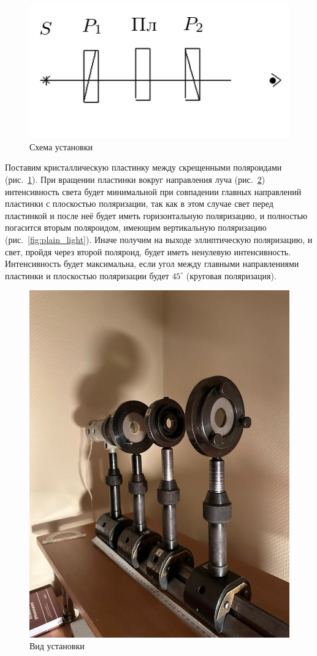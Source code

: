 \documentclass[a4paper, 12pt]{article}
\begin{document}
\begin{figure}[h!]
\begin{center}
   \includegraphics[width=0.5\linewidth]{plain_scheme.png}
\end{center}
\caption{Схема установки}
\label{fig:plain_scheme}
\end{figure}

Поставим кристаллическую пластинку между скрещенными поляроидами (рис.~\ref{fig:plain_scheme}). При вращении пластинки вокруг направления луча (рис.~\ref{fig:plain_ust}) интенсивность света будет минимальной при совпадении главных направлений пластинки с плоскостью поляризации, так как в этом случае свет перед пластинкой и после неё будет иметь горизонтальную поляризацию, и полностью погасится вторым поляроидом, имеющим вертикальную поляризацию (рис.~\ref{fig:plain_light}). Иначе получим на выходе эллиптическую поляризацию, и свет, пройдя через второй поляроид, будет иметь ненулевую интенсивность. Интенсивность будет максимальна, если угол между главными направлениями пластинки и плоскостью поляризации будет $45^{\circ}$ (круговая поляризация).

\begin{figure}[h!]
\begin{center}
   \includegraphics[width=0.4\linewidth]{plain_ust.jpg}
\end{center}
\caption{Вид установки}
\label{fig:plain_ust}
\end{figure}
\end{document}
